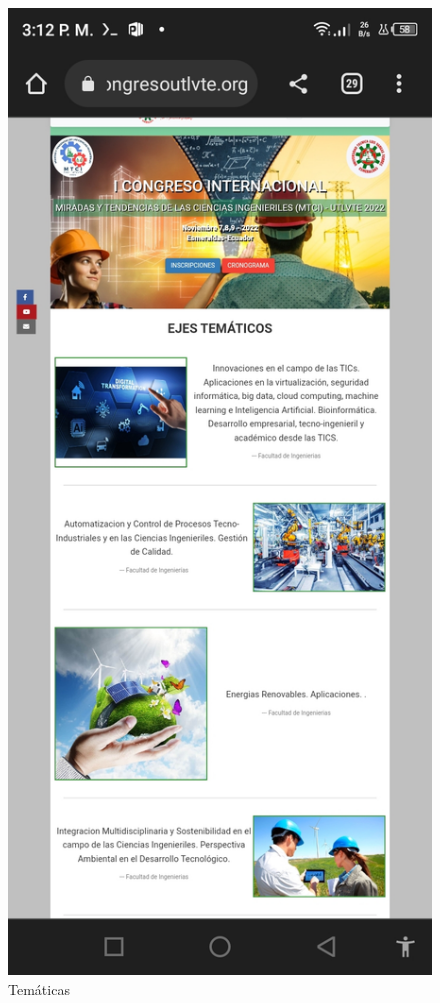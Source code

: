 \documentclass[a4paper,14px]{article}
\begin{document}
\begin{minipage}[H]{0.5\linewidth}
  \begin{figure}[H]
    \centering
    \includegraphics[scale=0.3]{tematicas.jpg}
    \caption{Temáticas}
    \label{fig:tematicas1}
  \end{figure}
\end{minipage}
\end{document}
